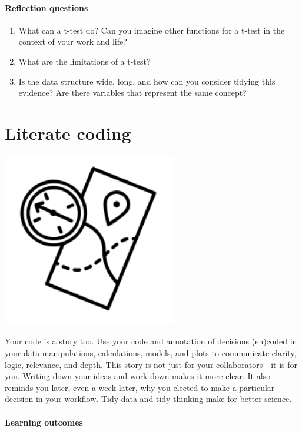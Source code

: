 \documentclass[
]{book}
\providecommand{\tightlist}{%
  \setlength{\itemsep}{0pt}\setlength{\parskip}{0pt}}
\begin{document}
\hypertarget{reflection-questions}{%
\subsubsection*{Reflection questions}\label{reflection-questions}}

\begin{enumerate}
\def\labelenumi{\arabic{enumi}.}
\tightlist
\item
  What can a t-test do? Can you imagine other functions for a t-test in the context of your work and life?
\item
  What are the limitations of a t-test?
\item
  Is the data structure wide, long, and how can you consider tidying this evidence? Are there variables that represent the same concept?
\end{enumerate}

\hypertarget{coding}{%
\chapter{Literate coding}\label{coding}}

\includegraphics[width=3in,height=\textheight]{./coding.png}

Your code is a story too. Use your code and annotation of decisions (en)coded in your data manipulations, calculations, models, and plots to communicate clarity, logic, relevance, and depth. This story is not just for your collaborators - it is for you. Writing down your ideas and work down makes it more clear. It also reminds you later, even a week later, why you elected to make a particular decision in your workflow. Tidy data and tidy thinking make for better science.

\hypertarget{learning-outcomes-2}{%
\subsubsection*{Learning outcomes}\label{learning-outcomes-2}}
\end{document}
